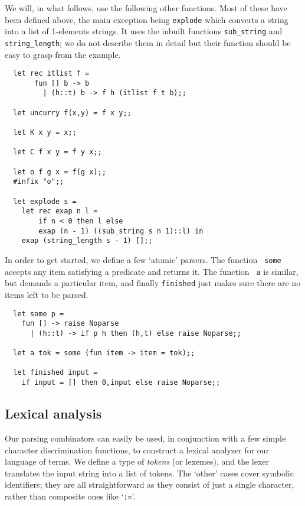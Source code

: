 We will, in what follows, use the following other functions. Most of these
have been defined above, the main exception being {\tt explode} which converts
a string into a list of 1-elements strings. It uses the inbuilt functions
{\verb!sub_string!} and {\verb!string_length!}; we do not describe them in
detail but their function should be easy to grasp from the example.

\begin{boxed}\begin{verbatim}
  let rec itlist f =
       fun [] b -> b
         | (h::t) b -> f h (itlist f t b);;

  let uncurry f(x,y) = f x y;;

  let K x y = x;;

  let C f x y = f y x;;

  let o f g x = f(g x);;
  #infix "o";;

  let explode s =
    let rec exap n l =
        if n < 0 then l else
        exap (n - 1) ((sub_string s n 1)::l) in
    exap (string_length s - 1) [];;
\end{verbatim}\end{boxed}

In order to get started, we define a few `atomic' parsers. The function {\tt
some} accepts any item satisfying a predicate and returns it. The function {\tt
a} is similar, but demands a particular item, and finally {\tt finished} just
makes sure there are no items left to be parsed.

\begin{boxed}\begin{verbatim}
  let some p =
    fun [] -> raise Noparse
      | (h::t) -> if p h then (h,t) else raise Noparse;;

  let a tok = some (fun item -> item = tok);;

  let finished input =
    if input = [] then 0,input else raise Noparse;;
\end{verbatim}\end{boxed}

\subsection{Lexical analysis}

Our parsing combinators can easily be used, in conjunction with a few simple
character discrimination functions, to construct a lexical analyzer for our
language of terms. We define a type of {\em tokens} (or lexemes), and the lexer
translates the input string into a list of tokens. The `other' cases cover
symbolic identifiers; they are all straightforward as they consist of just a
single character, rather than composite ones like `{\verb!:=!}'.

